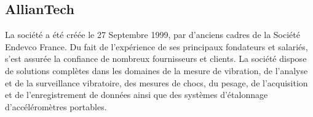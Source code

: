         \subsection{AllianTech}
        La société a été créée le 27 Septembre 1999, par d’anciens cadres de la Société Endevco France. Du fait de l’expérience de ses principaux fondateurs et salariés, s’est assurée la confiance de nombreux fournisseurs et clients. La société dispose de solutions complètes dans les domaines de la mesure de vibration, de l’analyse et de la surveillance vibratoire, des mesures de chocs, du pesage, de l’acquisition et de l’enregistrement de données ainsi que des systèmes d’étalonnage d’accéléromètres portables. 

